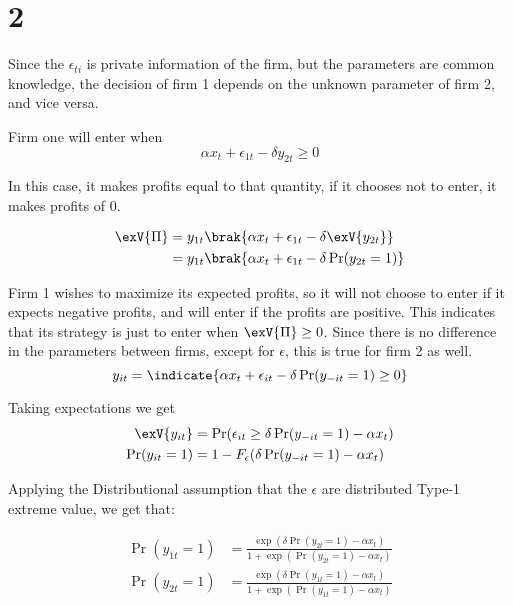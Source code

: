 \documentclass[12pt]{paper}
\begin{document}
\section{2}

Since the $\epsilon_{ti}$ is private information of the firm, but the
parameters are common knowledge, the decision of firm 1 depends on the
unknown parameter of firm 2, and vice versa.

Firm one will enter when
\begin{equation*}
  \alpha x_t + \epsilon_{1t} - \delta y_{2t} \geq 0
\end{equation*}

In this case, it makes profits equal to that quantity, if it chooses
not to enter, it makes profits of $0$.

\begin{align*}
  \exV{\Pi} &= y_{1t} \brak{\alpha x_t + \epsilon_{1t} - \delta \exV{y_{2t}}}\\
  &= y_{1t} \brak{\alpha x_t + \epsilon_{1t} - \delta \Pr( y_{2t} = 1)}
\end{align*}



Firm 1 wishes to maximize its expected profits, so it will not choose
to enter if it expects negative profits, and will enter if the profits
are positive. This indicates that its strategy is just to enter when
$\exV{\Pi} \geq 0$. Since there is no difference in the parameters between
firms, except for $\epsilon$, this is true for firm 2 as well.
\begin{equation*}
  y_{it} = \indicate{ \alpha x_t + \epsilon_{it} - \delta \Pr( y_{-it} = 1) \geq 0}
\end{equation*}

Taking expectations we get
\begin{align*}
  \exV{y_{it}} &= \Pr( \epsilon_{it} \geq \delta \Pr( y_{-it} = 1) - \alpha x_t )\\
  \Pr( y_{it} = 1) &= 1 - F_{\epsilon}( \delta \Pr( y_{-it} = 1) - \alpha x_t)
\end{align*}

Applying the Distributional assumption that the $\epsilon$ are distributed
Type-1 extreme value, we get that:

\begin{align*}
  \Pr( y_{1t} = 1) &= \frac{\exp(\delta \Pr( y_{2t} = 1) - \alpha x_t)}{1 +
                     \exp(\Pr(y_{2t} = 1) - \alpha x_t)}\\
  \Pr( y_{2t} = 1) &= \frac{\exp(\delta \Pr( y_{1t} = 1) - \alpha x_t)}{1 +
                     \exp(\Pr(y_{1t} = 1) - \alpha x_t)}
\end{align*}
\end{document}
